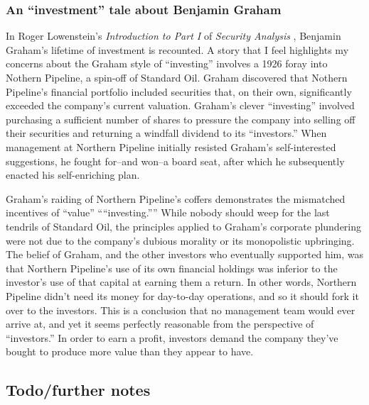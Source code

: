 \subsubsection{An ``investment'' tale about Benjamin Graham}

In Roger Lowenstein's {\it Introduction to Part I} of {\it Security Analysis} \cite{Graham2023}, Benjamin Graham's lifetime of investment is recounted.  A story that I feel highlights my concerns about the Graham style of ``investing'' involves a 1926 foray into Nothern Pipeline, a spin-off of Standard Oil.  Graham discovered that Nothern Pipeline's financial portfolio included securities that, on their own, significantly exceeded the company's current valuation.  Graham's clever ``investing'' involved purchasing a sufficient number of shares to pressure the company into selling off their securities and returning a windfall dividend to its ``investors.''  When management at Northern Pipeline initially resisted Graham's self-interested suggestions, he fought for--and won--a board seat, after which he subsequently enacted his self-enriching plan.

Graham's raiding of Northern Pipeline's coffers demonstrates the mismatched incentives of ``value'' ````investing.''''  While nobody should weep for the last tendrils of Standard Oil, the principles applied to Graham's corporate plundering were not due to the company's dubious morality or its monopolistic upbringing.  The belief of Graham, and the other investors who eventually supported him, was that Northern Pipeline's use of its own financial holdings was inferior to the investor's use of that capital at earning them a return.  In other words, Northern Pipeline didn't need its money for day-to-day operations, and so it should fork it over to the investors.  This is a conclusion that no management team would ever arrive at, and yet it seems perfectly reasonable from the perspective of ``investors.''  In order to earn a profit, investors demand the company they've bought to produce more value than they appear to have.


\subsection{Todo/further notes}

